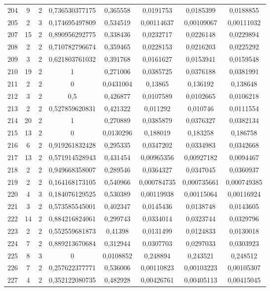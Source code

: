 \begin{longtable}{|c|c|c|c|c|c|c|c|}
204 & 9 & 2 & 0,736530377175 & 0,365558 & 0,0191753 & 0,0185399 & 0,0188855  \\
205 & 2 & 3 & 0,174695497809 & 0,534519 & 0,00114637 & 0,00109067 & 0,00111032  \\
207 & 15 & 2 & 0,890956292775 & 0,338436 & 0,0232717 & 0,0226148 & 0,0229894  \\
208 & 2 & 2 & 0,710782796674 & 0,359465 & 0,0228153 & 0,0216203 & 0,0225292  \\
209 & 3 & 2 & 0,621803761032 & 0,391768 & 0,0161627 & 0,0153941 & 0,0159548  \\
210 & 19 & 2 & 1 & 0,271006 & 0,0385725 & 0,0376188 & 0,0381991  \\
211 & 2 & 2 & 0 & 0,0431004 & 0,13865 & 0,136192 & 0,138648  \\
212 & 3 & 2 & 0,5 & 0,426877 & 0,0107589 & 0,0102665 & 0,0106218  \\
213 & 2 & 2 & 0,527859620831 & 0,421322 & 0,011292 & 0,010746 & 0,0111554  \\
214 & 20 & 2 & 1 & 0,270889 & 0,0385879 & 0,0376327 & 0,0382134  \\
215 & 13 & 2 & 0 & 0,0130296 & 0,188019 & 0,183258 & 0,186758  \\
216 & 6 & 2 & 0,919261832428 & 0,295335 & 0,0347202 & 0,0334983 & 0,0342668  \\
217 & 13 & 2 & 0,571914528943 & 0,431454 & 0,00965356 & 0,00927182 & 0,0094467  \\
218 & 2 & 2 & 0,949668358007 & 0,289546 & 0,0364327 & 0,0347045 & 0,0360937  \\
219 & 2 & 2 & 0,164168173105 & 0,540966 & 0,000784735 & 0,000735661 & 0,000749385  \\
220 & 4 & 3 & 0,184076129525 & 0,530389 & 0,00119938 & 0,00115064 & 0,00116924  \\
221 & 3 & 2 & 0,573585545001 & 0,402347 & 0,0145436 & 0,0138748 & 0,0143605  \\
222 & 14 & 2 & 0,884216824061 & 0,299743 & 0,0334014 & 0,0323744 & 0,0329796  \\
223 & 2 & 2 & 0,552559681873 & 0,41398 & 0,0131499 & 0,0124833 & 0,0130018  \\
224 & 7 & 2 & 0,889213670684 & 0,312944 & 0,0307703 & 0,0297033 & 0,0303923  \\
225 & 8 & 3 & 0 & 0,0108852 & 0,248894 & 0,243521 & 0,248512  \\
226 & 7 & 2 & 0,257622377771 & 0,536006 & 0,00110823 & 0,00103223 & 0,00105307  \\
227 & 4 & 2 & 0,352122080735 & 0,482928 & 0,00426761 & 0,00405113 & 0,00415045  \\

\end{longtable}
